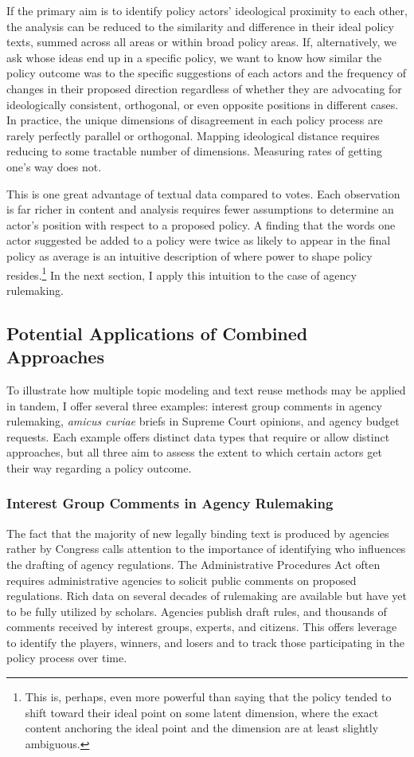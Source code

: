\documentclass{article}
\begin{document}
If the primary aim is to identify policy actors' ideological proximity to each other, the analysis can be reduced to the similarity and difference in their ideal policy texts, summed across all areas or within broad policy areas. If, alternatively, we ask whose ideas end up in a specific policy, we want to know how similar the policy outcome was to the specific suggestions of each actors and the frequency of changes in their proposed direction regardless of whether they are advocating for ideologically consistent, orthogonal, or even opposite positions in different cases. In practice, the unique dimensions of disagreement in each policy process are rarely perfectly parallel or orthogonal. Mapping ideological distance requires reducing to some tractable number of dimensions. Measuring rates of getting one's way does not.

This is one great advantage of textual data compared to votes. Each observation is far richer in content and analysis requires fewer assumptions to determine an actor's position with respect to a proposed policy. A finding that the words one actor suggested be added to a policy were twice as likely to appear in the final policy as average is an intuitive description of where power to shape policy resides.\footnote{This is, perhaps, even more powerful than saying that the policy tended to shift toward their ideal point on some latent dimension, where the exact content anchoring the ideal point and the dimension are at least slightly ambiguous.} In the next section, I apply this intuition to the case of agency rulemaking. 

\subsection{Potential Applications of Combined Approaches}
To illustrate how multiple topic modeling and text reuse methods may be applied in tandem, I offer several three examples: interest group comments in agency rulemaking, \textit{amicus curiae} briefs in Supreme Court opinions, and agency budget requests. Each example offers distinct data types that require or allow distinct approaches, but all three aim to assess the extent to which certain actors get their way regarding a policy outcome. 

\subsubsection{Interest Group Comments in Agency Rulemaking}
The fact that the majority of new legally binding text is produced by agencies rather by Congress calls attention to the importance of identifying who influences the drafting of agency regulations. The Administrative Procedures Act often requires administrative agencies to solicit public comments on proposed regulations. Rich data on several decades of rulemaking are available but have yet to be fully utilized by scholars. Agencies publish draft rules, and thousands of comments received by interest groups, experts, and citizens. This offers leverage to identify the players, winners, and losers and to track those participating in the policy process over time.
\end{document}
